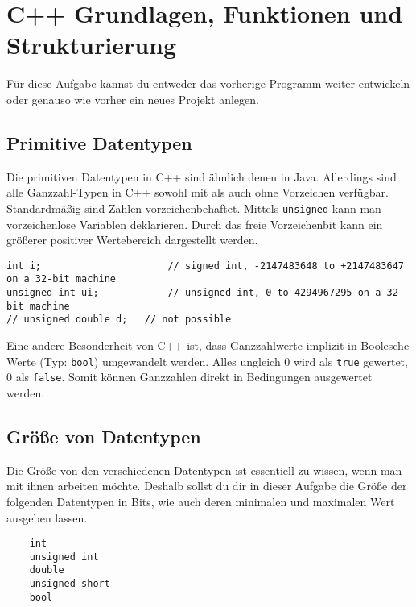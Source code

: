 \section{C++ Grundlagen, Funktionen und Strukturierung}
Für diese Aufgabe kannst du entweder das vorherige Programm weiter entwickeln oder genauso wie vorher ein neues Projekt anlegen.

\subsection*{Primitive Datentypen} 
Die primitiven Datentypen in C++ sind ähnlich denen in Java.
Allerdings sind alle Ganzzahl-Typen in C++ sowohl mit als auch ohne Vorzeichen verfügbar.
Standardmäßig sind Zahlen vorzeichenbehaftet.
Mittels \lstinline{unsigned} kann man vorzeichenlose Variablen deklarieren.
Durch das freie Vorzeichenbit kann ein größerer positiver Wertebereich dargestellt werden.

\begin{lstlisting}
int i;						// signed int, -2147483648 to +2147483647 on a 32-bit machine
unsigned int ui;			// unsigned int, 0 to 4294967295 on a 32-bit machine
// unsigned double d;	// not possible
\end{lstlisting}

Eine andere Besonderheit von C++ ist, dass Ganzzahlwerte implizit in Boolesche Werte (Typ: \lstinline{bool}) umgewandelt werden.
Alles ungleich 0 wird als \lstinline{true} gewertet, 0 als \lstinline{false}.
Somit können Ganzzahlen direkt in Bedingungen ausgewertet werden.

\subsection{Größe von Datentypen}
Die Größe von den verschiedenen Datentypen ist essentiell zu wissen, wenn man mit ihnen arbeiten möchte.
Deshalb sollst du dir in dieser Aufgabe die Größe der folgenden Datentypen in Bits, wie auch deren minimalen und maximalen Wert ausgeben lassen.

\begin{lstlisting}
    int
    unsigned int
    double
    unsigned short
    bool
\end{lstlisting}


